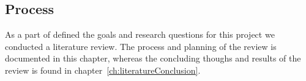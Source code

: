 \subsection*{Process}\label{ch:literatureProcess}
As a part of defined the goals and research questions for this project we conducted a literature review. The process and planning of the review is documented in this chapter, whereas the concluding thoughs and results of the review is found in chapter~\ref{ch:literatureConclusion}. 

	

